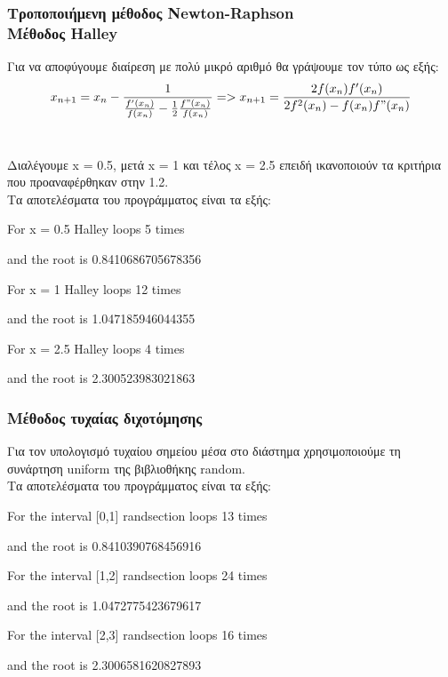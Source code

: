 \documentclass[a4paper,11pt]{article}
\newcommand{\lt}{\latintext}
\newcommand{\gt}{\greektext}
\begin{document}
	\subsubsection{Τροποποιήμενη μέθοδος \lt Newton-Raphson
	 \gt \\ Μέθοδος \lt Halley}
\normalsize{Για να αποφύγουμε διαίρεση με πολύ μικρό αριθμό θα 
γράψουμε τον τύπο ως εξής:}
\\
\begin{equation*}
	x_{n+1} = x_n - \frac{1}{\frac{f'(x_n)}{f(x_n)}-\frac{1}{2}
\frac{f"(x_n)}{f(x_n)}} => x_{n+1} =
\frac{2f(x_n)f'(x_n)}{2f^2(x_n)-f(x_n)f"(x_n)}
\end{equation*}
\\
\normalsize{Διαλέγουμε \lt x = 0.5\gt , μετά \lt x = 1 \gt  
και τέλος \lt x = 2.5 \gt επειδή ικανοποιούν τα κριτήρια 
που προαναφέρθηκαν στην 1.2. \\
Τα αποτελέσματα του προγράμματος είναι τα εξής:
\par\lt	For x = 0.5 Halley loops 5 times 	
\par and the root is 0.8410686705678356
\par For x = 1 Halley loops 12 times 
\par and the root is 1.047185946044355
\par For x = 2.5 Halley loops 4 times 
\par and the root is 2.300523983021863}

	\subsubsection{Μέθοδος τυχαίας διχοτόμησης}
	\normalsize{Για τον υπολογισμό τυχαίου σημείου μέσα στο διάστημα
χρησιμοποιούμε τη συνάρτηση \lt uniform \gt της βιβλιοθήκης \lt
random. \gt \\Τα αποτελέσματα του προγράμματος είναι τα εξής:
\par\lt For the interval [0,1] randsection loops 13 times 
\par and the root is 0.8410390768456916
\par For the interval [1,2] randsection loops 24 times 
\par and the root is 1.0472775423679617
\par For the interval [2,3] randsection loops 16 times 
\par and the root is 2.3006581620827893}
\end{document}

